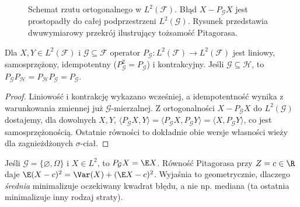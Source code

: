 \begin{figure}[htbp]
\centering
{}
\caption{Schemat rzutu ortogonalnego w $L^2(\mathcal F)$.
Błąd $X-P_{\mathcal G}X$ jest prostopadły do całej
podprzestrzeni $L^2(\mathcal G)$. Rysunek przedstawia
dwuwymiarowy przekrój ilustrujący tożsamość Pitagorasa.}
\label{fig:rp1-10-conditional-projection}
\end{figure}

\begin{wniosek}
Dla $X,Y\in L^2(\mathcal F)$ i
$\mathcal G\subseteq\mathcal F$ operator
$P_{\mathcal G}:L^2(\mathcal F)\to L^2(\mathcal F)$
jest liniowy, samosprzężony, idempotentny
($P_{\mathcal G}^2=P_{\mathcal G}$) i kontrakcyjny.
Jeśli $\mathcal G\subseteq\mathcal H$, to
$P_{\mathcal G}P_{\mathcal H}
=P_{\mathcal H}P_{\mathcal G}=P_{\mathcal G}$.
\end{wniosek}
\begin{proof}
Liniowość i kontrakcję wykazano wcześniej,
a idempotentność wynika z warunkowania zmiennej
już $\mathcal G$-mierzalnej. Z ortogonalności
$X-P_{\mathcal G}X$ do $L^2(\mathcal G)$
dostajemy, dla dowolnych $X,Y$,
$\langle P_{\mathcal G}X,Y\rangle
=\langle P_{\mathcal G}X,P_{\mathcal G}Y\rangle
=\langle X,P_{\mathcal G}Y\rangle$,
co jest samosprzężonością.
Ostatnie równości to dokładnie obie wersje
własności wieży dla zagnieżdżonych $\sigma$-ciał.
\end{proof}

\begin{przyklad}
Jeśli $\mathcal G=\{\varnothing,\Omega\}$ i $X\in L^2$,
to $P_{\mathcal G}X=\E X$. Równość Pitagorasa
przy $Z=c\in\R$ daje
$\E(X-c)^2=\Var(X)+(\E X-c)^2$.
Wyjaśnia to geometrycznie, dlaczego \emph{średnia}
minimalizuje oczekiwany kwadrat błędu, a nie np.
mediana (ta ostatnia minimalizuje inny rodzaj straty).
\end{przyklad}

